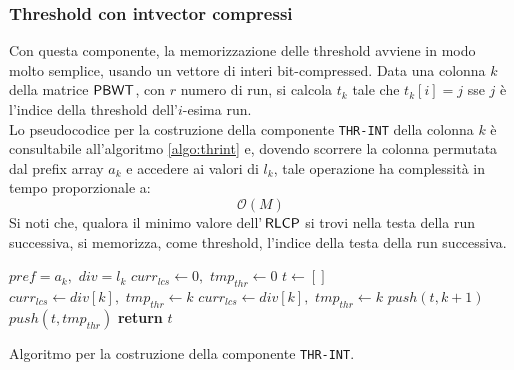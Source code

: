 \subsubsection{Threshold con intvector compressi}
Con questa componente, la memorizzazione delle threshold avviene in modo molto
semplice, 
usando un vettore di interi bit-compressed. Data una colonna $k$ della
matrice $\mbox{\rm {\sf PBWT}}$, con $r$ numero di run, si calcola $t_k$ tale che
$t_k[i]=j$ sse $j$ è l'indice della threshold dell'$i$-esima run.\\
Lo pseudocodice per la costruzione della componente
\texttt{THR-INT} della colonna $k$ è consultabile all'algoritmo
\ref{algo:thrint} 
e, dovendo scorrere la colonna permutata dal prefix array $a_k$ e
accedere ai valori di $l_k$, tale operazione ha complessità in tempo
proporzionale a:
\begin{equation}
  \label{eq:thrint}
  \mathcal{O}(M)
\end{equation}
Si noti che, qualora il minimo valore dell'$\,\mbox{\rm {\sf RLCP}}$ si trovi nella testa della
run successiva, si memorizza, come threshold, l'indice della testa della run
successiva.
\begin{algorithm}
  \begin{algorithmic}
    \Comment $pref=a_k,\,\,div=l_k$
    \State $curr_{lcs}\gets 0,\,\,tmp_{thr}\gets 0$
    \State $t\gets[]$
    \For {\textit{every} $k\in\left[0,\,\, M\right)$}
    \State $curr_{lcs}\gets div[k],\,\,tmp_{thr}\gets k$
    \EndIf
    \State $curr_{lcs}\gets div[k],\,\,tmp_{thr}\gets k$
    \EndIf
    \State $push(t, k+1)$
    \Else 
    \State $push(t, tmp_{thr})$
    \EndIf
    \EndIf
    \EndFor
    \State \textbf{return} $t$  
    \EndFunction
  \end{algorithmic}
  \caption{Algoritmo per la costruzione della componente \texttt{THR-INT}.}
  \label{algo:thrint}
\end{algorithm}
